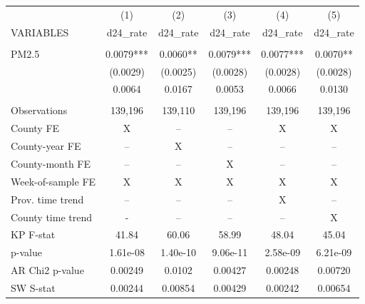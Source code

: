 \begin{tabular}{lccccc} \hline
 & (1) & (2) & (3) & (4) & (5) \\
VARIABLES & d24\_rate & d24\_rate & d24\_rate & d24\_rate & d24\_rate \\ \hline
 &  &  &  &  &  \\
PM2.5 & 0.0079*** & 0.0060** & 0.0079*** & 0.0077*** & 0.0070** \\
 & (0.0029) & (0.0025) & (0.0028) & (0.0028) & (0.0028) \\
 & 0.0064 & 0.0167 & 0.0053 & 0.0066 & 0.0130 \\
 &  &  &  &  &  \\
Observations & 139,196 & 139,110 & 139,196 & 139,196 & 139,196 \\
County FE & X & -- & -- & X & X \\
County-year FE & -- & X & -- & -- & -- \\
County-month FE & -- & -- & X & -- & -- \\
Week-of-sample FE & X & X & X & X & X \\
Prov. time trend & -- & -- & -- & X & -- \\
County time trend & - & -- & -- & -- & X \\
KP F-stat & 41.84 & 60.06 & 58.99 & 48.04 & 45.04 \\
p-value & 1.61e-08 & 1.40e-10 & 9.06e-11 & 2.58e-09 & 6.21e-09 \\
AR Chi2 p-value & 0.00249 & 0.0102 & 0.00427 & 0.00248 & 0.00720 \\
 SW S-stat & 0.00244 & 0.00854 & 0.00429 & 0.00242 & 0.00654 \\ \hline
\end{tabular}
